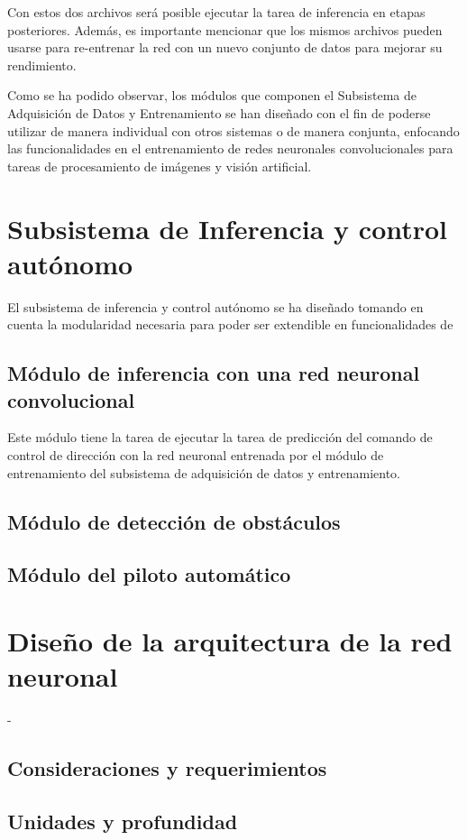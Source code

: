     Con estos dos archivos será posible ejecutar la tarea de inferencia en etapas posteriores. Además, es importante mencionar que 
    los mismos archivos pueden usarse para re-entrenar la red con un nuevo conjunto de datos para mejorar su rendimiento.

    Como se ha podido observar, los módulos que componen el Subsistema de Adquisición de Datos y Entrenamiento se han diseñado 
    con el fin de poderse utilizar de manera individual con otros sistemas o de manera conjunta, enfocando las funcionalidades 
    en el entrenamiento de redes neuronales convolucionales para tareas de procesamiento de imágenes y visión artificial.

\section{Subsistema de Inferencia y control autónomo}
El subsistema de inferencia y control autónomo se ha diseñado tomando en cuenta la modularidad necesaria para poder ser 
extendible en funcionalidades de 
    \subsection{Módulo de inferencia con una red neuronal convolucional}
    Este módulo tiene la tarea de ejecutar la tarea de predicción del comando de control de dirección con la red neuronal entrenada 
    por el módulo de entrenamiento del subsistema de adquisición de datos y entrenamiento.
    \subsection{Módulo de detección de obstáculos}
    \subsection{Módulo del piloto automático}

\section{Diseño de la arquitectura de la red neuronal}
-
    \subsection{Consideraciones y requerimientos}
    \subsection{Unidades y profundidad}
